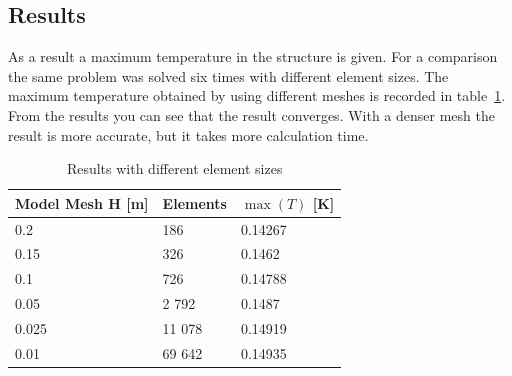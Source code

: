 \subsection*{Results}

As a result a maximum temperature in the structure is given. For a 
comparison the same problem was solved six times with different 
element sizes. The maximum temperature obtained
by using different meshes is recorded in table~\ref{tb:struct1}.
From the results you can see that the result converges. With a denser mesh 
the result is more accurate, but it takes more calculation time. 

\begin{table}
\caption{Results with different element sizes}
\label{tb:struct1}
\begin{center}
\begin{tabular}{lll} \hline
Model Mesh H [m]  & Elements & $\max (T)$ [K] \\ \hline
0.2 & 186 &  0.14267 \\ 
0.15 & 326 & 0.1462  \\ 
0.1 &  726 & 0.14788 \\
0.05 & 2 792 & 0.1487  \\ 
0.025 & 11 078 & 0.14919  \\ 
0.01  & 69 642 & 0.14935 \\ \hline
\end{tabular}
\end{center}
\end{table}




